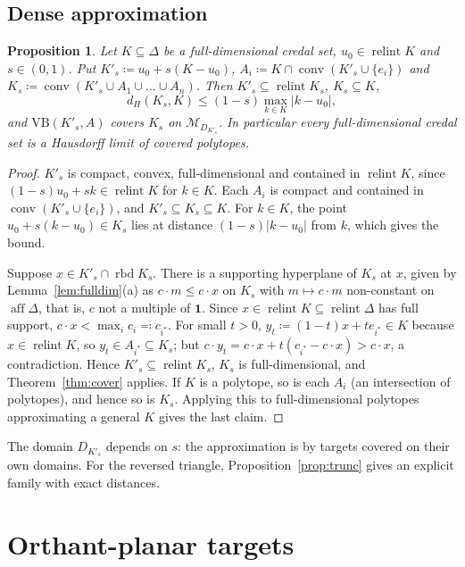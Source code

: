 \documentclass[11pt]{article}
\newcommand{\one}{\mathbf{1}}
\newcommand{\M}{\mathcal{M}}
\newcommand{\VB}{\mathrm{VB}}
\DeclareMathOperator{\conv}{conv}
\DeclareMathOperator{\relint}{relint}
\DeclareMathOperator{\rbd}{rbd}
\DeclareMathOperator{\aff}{aff}
\theoremstyle{plain}
\newtheorem{proposition}[theorem]{Proposition}
\theoremstyle{definition}
\theoremstyle{remark}
\begin{document}
\subsection{Dense approximation}\label{sec:dense}

\begin{proposition}\label{prop:dense}
Let $K\subseteq\Delta$ be a full-dimensional credal set, $u_0\in\relint K$ and
$s\in(0,1)$. Put $K'_s\coloneqq u_0+s(K-u_0)$, $A_i\coloneqq K\cap\conv(K'_s\cup\{e_i\})$
and $K_s\coloneqq\conv(K'_s\cup A_1\cup\dots\cup A_n)$. Then $K'_s\subseteq\relint K_s$,
$K_s\subseteq K$,
\[
  d_H(K_s,K)\le(1-s)\max_{k\in K}|k-u_0|,
\]
and $\VB(K'_s,A)$ covers $K_s$ on $\M_{D_{K'_s}}$. In particular every full-dimensional
credal set is a Hausdorff limit of covered polytopes.
\end{proposition}

\begin{proof}
$K'_s$ is compact, convex, full-dimensional and contained in $\relint K$, since
$(1-s)u_0+sk\in\relint K$ for $k\in K$. Each $A_i$ is compact and contained in
$\conv(K'_s\cup\{e_i\})$, and $K'_s\subseteq K_s\subseteq K$. For $k\in K$, the point
$u_0+s(k-u_0)\in K_s$ lies at distance $(1-s)|k-u_0|$ from $k$, which gives the bound.

Suppose $x\in K'_s\cap\rbd K_s$. There is a supporting hyperplane of $K_s$ at $x$, given by
Lemma~\ref{lem:fulldim}(a) as $c\cdot m\le c\cdot x$ on $K_s$ with $m\mapsto c\cdot m$
non-constant on $\aff\Delta$, that is, $c$ not a multiple of $\one$. Since $x\in\relint
K\subseteq\relint\Delta$ has full support, $c\cdot x<\max_ic_i\eqqcolon c_{i^\ast}$. For
small $t>0$, $y_t\coloneqq(1-t)x+te_{i^\ast}\in K$ because $x\in\relint K$, so $y_t\in
A_{i^\ast}\subseteq K_s$; but $c\cdot y_t=c\cdot x+t(c_{i^\ast}-c\cdot x)>c\cdot x$, a
contradiction. Hence $K'_s\subseteq\relint K_s$, $K_s$ is full-dimensional, and
Theorem~\ref{thm:cover} applies. If $K$ is a polytope, so is each $A_i$ (an intersection
of polytopes), and hence so is $K_s$. Applying this to full-dimensional polytopes
approximating a general $K$ gives the last claim.
\end{proof}

The domain $D_{K'_s}$ depends on $s$: the approximation is by targets covered on their own
domains. For the reversed triangle, Proposition~\ref{prop:trunc} gives an explicit family
with exact distances.

\section{Orthant-planar targets}\label{sec:op}
\end{document}
